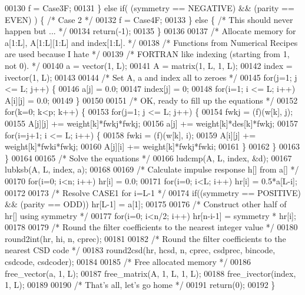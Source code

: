 \begin{DoxyCode}
00130         f = Case3F;
00131     \} \textcolor{keywordflow}{else} \textcolor{keywordflow}{if}( (symmetry == NEGATIVE) && (parity == EVEN) ) \{   \textcolor{comment}{/* Case 2 */}
00132         f = Case4F;
00133     \} \textcolor{keywordflow}{else} \{    \textcolor{comment}{/* This should never happen but ... */}
00134         \textcolor{keywordflow}{return}(-1);
00135     \}
00136 
00137     \textcolor{comment}{/* Allocate memory for a[1:L], A[1:L][1:L] and index[1:L]. */}
00138     \textcolor{comment}{/* Functions from Numerical Recipes are used because I hate  */}
00139     \textcolor{comment}{/* FORTRAN like indexing (starting from 1, not 0). */}
00140     a = vector(1, L);
00141     A = matrix(1, L, 1, L);
00142     index = ivector(1, L);
00143 
00144     \textcolor{comment}{/* Set A, a and index all to zeroes */}
00145     \textcolor{keywordflow}{for}(j=1; j <= L; j++) \{
00146         a[j] = 0.0;
00147         index[j] = 0;
00148         \textcolor{keywordflow}{for}(i=1; i <= L; i++) A[i][j] = 0.0;
00149     \}
00150 
00151     \textcolor{comment}{/* OK, ready to fill up the equations */}
00152     \textcolor{keywordflow}{for}(k=0; k<p; k++) \{
00153         \textcolor{keywordflow}{for}(j=1; j <= L; j++) \{
00154             fwkj = (f)(w[k], j);
00155             A[j][j] += weight[k]*fwkj*fwkj;
00156             a[j] += weight[k]*des[k]*fwkj;
00157             \textcolor{keywordflow}{for}(i=j+1; i <= L; i++) \{
00158                 fwki = (f)(w[k], i);
00159                 A[i][j] += weight[k]*fwki*fwkj;
00160                 A[j][i] += weight[k]*fwkj*fwki;
00161             \}
00162         \}
00163     \}
00164 
00165     \textcolor{comment}{/* Solve the equations */}
00166     ludcmp(A, L, index, &d); 
00167     lubksb(A, L, index, a);
00168 
00169     \textcolor{comment}{/* Calculate impulse response h[] from a[] */}
00170     \textcolor{keywordflow}{for}(i=0; i<n; i++) hr[i] = 0.0;
00171     \textcolor{keywordflow}{for}(i=0; i<L; i++) hr[i] = 0.5*a[L-i];
00172 
00173     \textcolor{comment}{/* Resolve CASE1 for i=L-1 */}
00174     \textcolor{keywordflow}{if}((symmetry == POSITIVE) && (parity == ODD)) hr[L-1] = a[1];
00175 
00176     \textcolor{comment}{/* Construct other half of hr[] using symmetry */}
00177     \textcolor{keywordflow}{for}(i=0; i<n/2; i++) hr[n-i-1] = symmetry * hr[i];
00178 
00179     \textcolor{comment}{/* Round the filter coefficients to the nearest integer value */}
00180     round2int(hr, hi, n, cprec);
00181 
00182     \textcolor{comment}{/* Round the filter coefficients to the nearest CSD code */}
00183     round2csd(hr, hcsd, n, cprec, csdprec, bincode, csdcode, csdcoder);
00184 
00185     \textcolor{comment}{/* Free allocated memory */}
00186     free_vector(a, 1, L);
00187     free_matrix(A, 1, L, 1, L);
00188     free_ivector(index, 1, L);
00189 
00190     \textcolor{comment}{/* That's all, let's go home */}
00191     \textcolor{keywordflow}{return}(0);
00192 \}
\end{DoxyCode}

